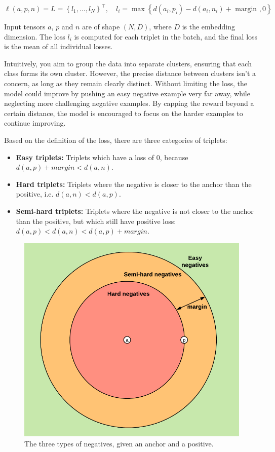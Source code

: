 $\ell(a, p, n)=L=\left\{l_1, \ldots, l_N\right\}^{\top}, \quad l_i=\max \left\{d\left(a_i, p_i\right)-d\left(a_i, n_i\right)+\text { margin }, 0\right\}$

Input tensors $a$, $p$ and $n$ are of shape $(N, D)$, where $D$ is the embedding dimension. The loss $l_i$ is computed for each triplet in the batch, and the final loss is the mean of all individual losses.

Intuitively, you aim to group the data into separate clusters, ensuring that each class forms its own cluster. However, the precise distance between clusters isn't a concern, as long as they remain clearly distinct. Without limiting the loss, the model could improve by pushing an easy negative example very far away, while neglecting more challenging negative examples. By capping the reward beyond a certain distance, the model is encouraged to focus on the harder examples to continue improving.

Based on the definition of the loss, there are three categories of triplets:
\begin{itemize}
  \item \textbf{Easy triplets:} Triplets which have a loss of $0$, because $d(a, p) + margin < d(a, n)$.
  \item \textbf{Hard triplets:} Triplets where the negative is closer to the anchor than the positive, i.e. $d(a, n) < d(a, p)$.
  \item \textbf{Semi-hard triplets:} Triplets where the negative is not closer to the anchor than the positive, but which still have positive loss: $d(a, p) < d(a, n) < d(a, p) + margin$.
\end{itemize}

\begin{figure}[h]
  \centering
  \includegraphics[width=0.5\columnwidth]{images/negative_types.png}
  \caption{The three types of negatives, given an anchor and a positive.}
  \label{fig:negative_types}
\end{figure}

